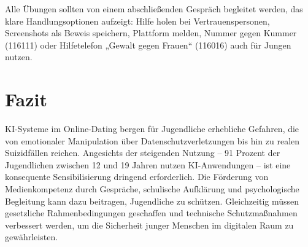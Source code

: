 \documentclass[12pt,a4paper,oneside]{scrartcl}
\begin{document}
	Alle Übungen sollten von einem abschließenden Gespräch begleitet werden, das klare Handlungsoptionen aufzeigt: Hilfe holen bei Vertrauenspersonen, Screenshots als Beweis speichern, Plattform melden, Nummer gegen Kummer (116111) oder Hilfetelefon „Gewalt gegen Frauen“ (116016) auch für Jungen nutzen.
	
	\section{Fazit}
	
	KI-Systeme im Online-Dating bergen für Jugendliche erhebliche Gefahren, die von emotionaler Manipulation über Datenschutzverletzungen bis hin zu realen Suizidfällen reichen. Angesichts der steigenden Nutzung – 91 Prozent der Jugendlichen zwischen 12 und 19 Jahren nutzen KI-Anwendungen \cite{JIM2025} – ist eine konsequente Sensibilisierung dringend erforderlich. Die Förderung von Medienkompetenz durch Gespräche, schulische Aufklärung und psychologische Begleitung kann dazu beitragen, Jugendliche zu schützen. Gleichzeitig müssen gesetzliche Rahmenbedingungen geschaffen und technische Schutzmaßnahmen verbessert werden, um die Sicherheit junger Menschen im digitalen Raum zu gewährleisten.
	
\end{document}
